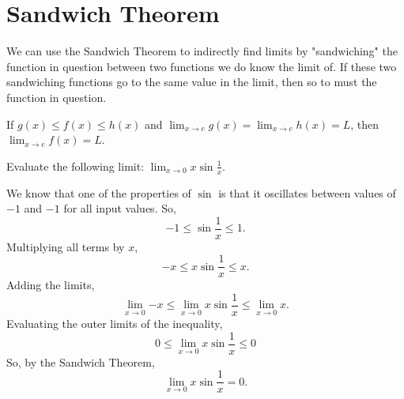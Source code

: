\section{Sandwich Theorem}
We can use the Sandwich Theorem to indirectly find limits by "sandwiching" the function in question between two functions we do know the limit of.
If these two sandwiching functions go to the same value in the limit, then so to must the function in question.
\begin{theorem}
	If $g(x) \leq f(x) \leq h(x)$ and $\lim_{x \to c}{g(x)} = \lim_{x\to c}{h(x)} = L$, then $\lim_{x \to c}{f(x)} = L$.
\end{theorem}

\begin{example}
	Evaluate the following limit: $\lim_{x \to 0}{x\sin{\frac{1}{x}}}$.
\end{example}
We know that one of the properties of $\sin$ is that it oscillates between values of $-1$ and $-1$ for all input values.
So,
\begin{equation*}
	-1 \leq \sin{\frac{1}{x}} \leq 1.
\end{equation*}
\indent
Multiplying all terms by $x$,
\begin{equation*}
	-x \leq x\sin{\frac{1}{x}} \leq x.
\end{equation*}
\indent
Adding the limits,
\begin{equation*}
	\lim_{x\to 0}{-x} \leq \lim_{x \to 0}{x\sin{\frac{1}{x}}} \leq \lim_{x \to 0}{x}.
\end{equation*}
\indent
Evaluating the outer limits of the inequality,
\begin{equation*}
	0 \leq \lim_{x \to 0}{x\sin{\frac{1}{x}}} \leq 0
\end{equation*}
\indent
So, by the Sandwich Theorem,
\begin{equation*}
	\lim_{x \to 0}{x\sin{\frac{1}{x}}} = 0.
\end{equation*}